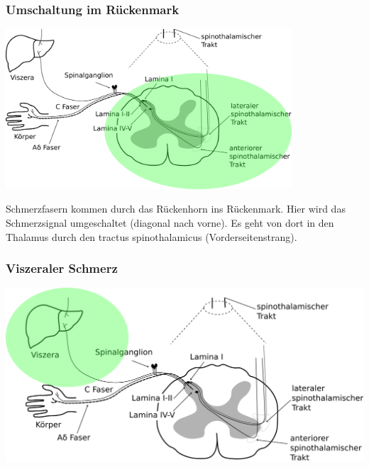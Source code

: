 \documentclass{beamer}
\begin{document}
\begin{frame}
\frametitle{Umschaltung im Rückenmark}

\begin{center}
\includegraphics[width=0.8\textwidth]{Schmerz_aufsteigend_bis_Rueckenmark_Rueckenmark.png}
\end{center}

Schmerzfasern kommen durch das Rückenhorn ins Rückenmark. Hier wird das Schmerzsignal umgeschaltet (diagonal nach vorne). Es geht von dort in den Thalamus durch den tractus spinothalamicus (Vorderseitenstrang). 

\end{frame}


\begin{frame}

\frametitle{Viszeraler Schmerz}

 \begin{center}
\includegraphics[width=\textwidth]{Schmerz_aufsteigend_bis_Rueckenmark_Viszera.png}
\end{center}


\end{frame}
\end{document}
